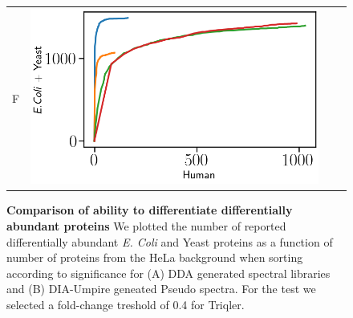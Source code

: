 \documentclass[11pt]{article}
\begin{document}
\begin{figure}[hbt]
\begin{tabular}{lclc}
        F & \includegraphics[width=0.45\linewidth]{../../result/report_plots/diann_de_human_vs_ecoli_and_yeast.png} \\ 

    \end{tabular}
    \caption{{\bf Comparison of ability to differentiate differentially abundant proteins} We plotted the number of reported differentially abundant  {\em E. Coli} and Yeast proteins as a function of number of proteins from the HeLa background when sorting according to significance for (A) DDA generated spectral libraries and (B) DIA-Umpire geneated Pseudo spectra. For the test we selected a fold-change treshold of 0.4 for Triqler. \label{fig:ability_to_differentiate_differentially_abundant_specie_vs_hela}}
\end{figure}

\iffalse
\end{document}
